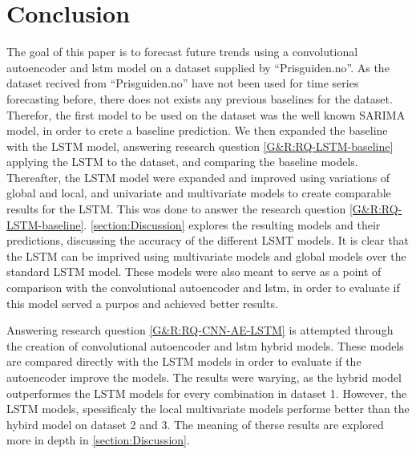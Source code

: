 \section{Conclusion}
\label{section:Discussion:Clonclusion}



The goal of this paper is to forecast future trends using a convolutional autoencoder and lstm model
on a dataset supplied by ``Prisguiden.no''.
As the dataset recived from ``Prisguiden.no'' have not been used for time series forecasting before,
there does not exists any previous baselines for the dataset.
Therefor, the first model to be used on the dataset was the well known SARIMA model,
in order to crete a baseline prediction.
We then expanded the baseline with the LSTM model, answering research question \cref{G&R:RQ-LSTM-baseline}
applying the LSTM to the dataset, and comparing the baseline models.
Thereafter, the LSTM model were expanded and improved using variations of global and local, and univariate and multivariate models
to create comparable results for the LSTM. This was done to answer the research question \cref{G&R:RQ-LSTM-baseline}.
\cref{section:Discussion} explores the resulting models and their predictions, discussing the accuracy of the different LSMT models.
It is clear that the LSTM can be imprived using multivariate models and global models over the standard LSTM model.
These models were also meant to serve as a point of comparison with the convolutional autoencoder and lstm,
in order to evaluate if this model served a purpos and achieved better results.

Answering research question \cref{G&R:RQ-CNN-AE-LSTM} is attempted through the creation of convolutional autoencoder and lstm hybrid models.
These models are compared directly with the LSTM models in order to evaluate if the autoencoder improve the models.
The results were warying, as the hybrid model outperformes the LSTM models for every combination in dataset 1.
However, the LSTM models, spessificaly the local multivariate models performe better than the hybird model on dataset 2 and 3.
The meaning of therse results are explored more in depth in \cref{section:Discussion}.

